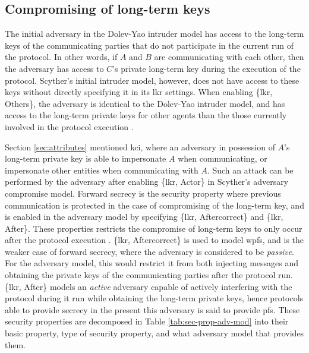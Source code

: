 \subsection{Compromising of long-term keys}

The initial adversary in the Dolev-Yao intruder model has access to the long-term keys of the communicating parties that do not participate in the current run of the protocol. In other words, if $A$ and $B$ are communicating with each other, then the adversary has access to $C$'s private long-term key during the execution of the protocol. Scyther's initial intruder model, however, does not have access to these keys without directly specifying it in its \gls{lkr} settings. When enabling \{\gls{lkr}, Others\}, the adversary is identical to the Dolev-Yao intruder model, and has access to the long-term private keys for other agents than the those currently involved in the protocol execution \cite{basin2010modeling}.

Section \ref{sec:attributes} mentioned \gls{kci}, where an adversary in possession of $A$'s long-term private key is able to impersonate $A$ when communicating, or impersonate other entities when communicating with $A$. Such an attack can be performed by the adversary after enabling \{\gls{lkr}, Actor\} in Scyther's adversary compromise model. Forward secrecy is the security property where previous communication is protected in the case of compromising of the long-term key, and is enabled in the adversary model by specifying \{\gls{lkr}, Aftercorrect\} and \{\gls{lkr}, After\}. These properties restricts the compromise of long-term keys to only occur after the protocol execution \cite{basin2010modeling}. \{\gls{lkr}, Aftercorrect\} is used to model \gls{wpfs}, and is the weaker case of forward secrecy, where the adversary is considered to be \emph{passive}. For the adversary model, this would restrict it from both injecting messages and obtaining the private keys of the communicating parties after the protocol run.  \{\gls{lkr}, After\} models an \emph{active} adversary capable of actively interfering with the protocol during it run while obtaining the long-term private keys, hence protocols able to provide secrecy in the present this adversary is said to provide \gls{pfs}. These security properties are decomposed in Table \ref{tab:sec-prop-adv-mod} into their basic property, type of security property, and what adversary model that provides them.

